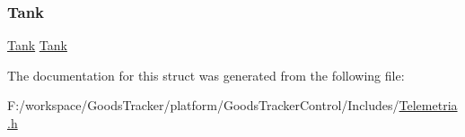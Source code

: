 \mbox{\label{struct_telemetria_a5240b2978ed6fee82c42ba9a17153985}} 
\subsubsection{\texorpdfstring{Tank}{Tank}}
{\footnotesize\ttfamily \hyperlink{struct_tank}{Tank} \hyperlink{struct_tank}{Tank}}



The documentation for this struct was generated from the following file\+:\begin{DoxyCompactItemize}
\item 
F\+:/workspace/\+Goods\+Tracker/platform/\+Goods\+Tracker\+Control/\+Includes/\hyperlink{_telemetria_8h}{Telemetria.\+h}\end{DoxyCompactItemize}

